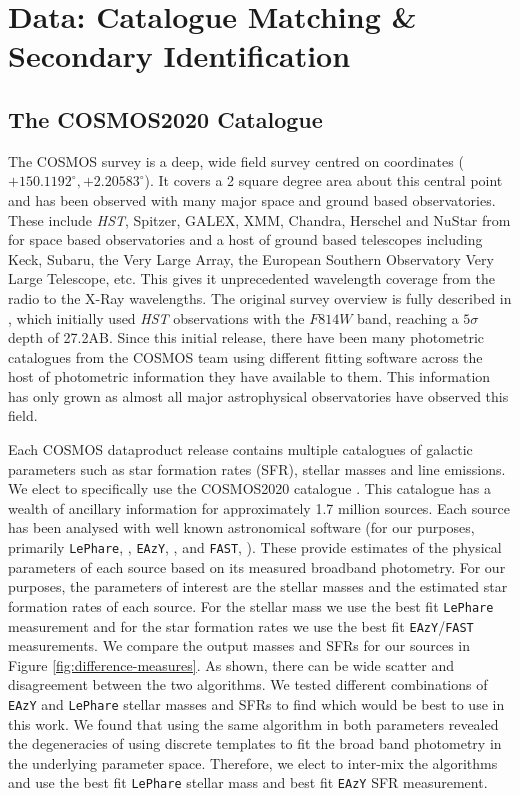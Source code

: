 \section{Data: Catalogue Matching \& Secondary Identification} \label{data}
\subsection{The COSMOS2020 Catalogue}
The COSMOS survey is a deep, wide field survey centred on coordinates \linebreak ($+150.1192^{\circ}, +2.20583^{\circ}$). It covers a 2 square degree area about this central point and has been observed with many major space and ground based observatories. These include \textit{HST}, Spitzer, GALEX, XMM, Chandra, Herschel and NuStar from for space based observatories and a host of ground based telescopes including Keck, Subaru, the Very Large Array, the European Southern Observatory Very Large Telescope, etc. This gives it unprecedented wavelength coverage from the radio to the X-Ray wavelengths. The original survey overview is fully described in \citet{2007ApJS..172....1S}, which initially used \textit{HST} observations with the $F814W$ band, reaching a $5\sigma$ depth of 27.2AB. Since this initial release, there have been many photometric catalogues from the COSMOS team using different fitting software across the host of photometric information they have available to them. This information has only grown as almost all major astrophysical observatories have observed this field.

Each COSMOS dataproduct release contains multiple catalogues of galactic parameters such as star formation rates (SFR), stellar masses and line emissions. We elect to specifically use the COSMOS2020 catalogue \citep{2022ApJS..258...11W}. This catalogue has a wealth of ancillary information for approximately 1.7 million sources. Each source has been analysed with well known astronomical software (for our purposes, primarily \texttt{LePhare}, \citealt{1999MNRAS.310..540A, 2006A&A...457..841I}, \texttt{EAzY},  \citealt{2008ApJ...686.1503B}, and \texttt{FAST}, \citealt{2017MNRAS.465.3390A}). These provide estimates of the physical parameters of each source based on its measured broadband photometry. For our purposes, the parameters of interest are the stellar masses and the estimated star formation rates of each source. For the stellar mass we use the best fit \texttt{LePhare} measurement and for the star formation rates we use the best fit \texttt{EAzY}/\texttt{FAST} measurements. We compare the output masses and SFRs for our sources in Figure \ref{fig:difference-measures}. As shown, there can be wide scatter and disagreement between the two algorithms. We tested different combinations of \texttt{EAzY} and \texttt{LePhare} stellar masses and SFRs to find which would be best to use in this work. We found that using the same algorithm in both parameters revealed the degeneracies of using discrete templates to fit the broad band photometry in the underlying parameter space. Therefore, we elect to inter-mix the algorithms and use the best fit \texttt{LePhare} stellar mass and best fit \texttt{EAzY} SFR measurement.

